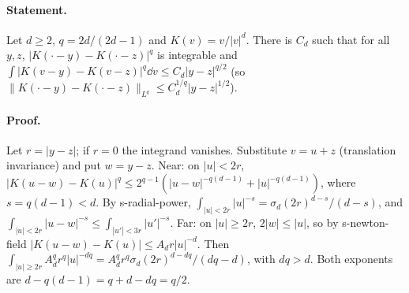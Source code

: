 \paragraph{Statement.} Let $d\geq2$, $q=2d/(2d-1)$ and $K(v)=v/|v|^d$. There is $C_d$ such that for all
$y,z$, $|K(\cdot-y)-K(\cdot-z)|^q$ is integrable and $\int|K(v-y)-K(v-z)|^q\dd v\leq C_d|y-z|^{q/2}$
(so $\|K(\cdot-y)-K(\cdot-z)\|_{L^q}\leq C_d^{1/q}|y-z|^{1/2}$).
\paragraph{Proof.} Let $r=|y-z|$; if $r=0$ the integrand vanishes. Substitute $v=u+z$ (translation
invariance) and put $w=y-z$. Near: on $|u|<2r$, $|K(u-w)-K(u)|^q\leq2^{q-1}(|u-w|^{-q(d-1)}+|u|^{-q(d-1)})$,
where $s=q(d-1)<d$. By s-radial-power, $\int_{|u|<2r}|u|^{-s}=\sigma_d(2r)^{d-s}/(d-s)$, and
$\int_{|u|<2r}|u-w|^{-s}\leq\int_{|u'|<3r}|u'|^{-s}$. Far: on $|u|\geq2r$, $2|w|\leq|u|$, so by s-newton-field
$|K(u-w)-K(u)|\leq A_dr|u|^{-d}$. Then $\int_{|u|\geq2r}A_d^qr^q|u|^{-dq}=A_d^qr^q\sigma_d(2r)^{d-dq}/(dq-d)$,
with $dq>d$. Both exponents are $d-q(d-1)=q+d-dq=q/2$.
